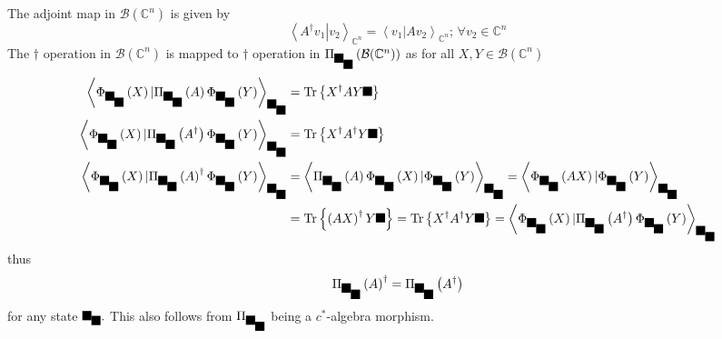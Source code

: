 \documentclass[aps,preprint]{revtex4}%
\providecommand{\U}[1]{\protect\rule{.1in}{.1in}}
\begin{document}
The adjoint map in $\mathcal{B}(\mathbb{C}^{n})$ is given by
\begin{equation}
\left\langle \left.  A^{\dagger}v_{1}\right\vert v_{2}\right\rangle
_{\mathbb{C}^{n}}=\left\langle \left.  v_{1}\right\vert Av_{2}\right\rangle
_{\mathbb{C}^{n}};\,\forall v_{2}\in\mathbb{C}^{n}%
\end{equation}
The $\dagger$ operation in $\mathcal{B}(\mathbb{C}^{n})$ is mapped to
$\dagger$ operation in $\Pi_{\U{3c9} _{\U{3c1} }}\left(  \mathcal{B}%
(\mathbb{C}^{n})\right)  $ as for all $X,Y\in\mathcal{B}(\mathbb{C}^{n})$
\begin{align}
\left\langle \Phi_{\U{3c9} _{\U{3c1} }}\left(  X\right)  |\Pi_{\U{3c9}
_{\U{3c1} }}\left(  A\right)  \Phi_{\U{3c9} _{\U{3c1} }}\left(  Y\right)
\right\rangle _{\U{3c9} _{\U{3c1} }}  &  =\operatorname{Tr}\left\{
X^{\dagger}AY\U{3c1} \right\} \\
\left\langle \Phi_{\U{3c9} _{\U{3c1} }}\left(  X\right)  |\Pi_{\U{3c9}
_{\U{3c1} }}\left(  A^{\dagger}\right)  \Phi_{\U{3c9} _{\U{3c1} }}\left(
Y\right)  \right\rangle _{\U{3c9} _{\U{3c1} }}  &  =\operatorname{Tr}\left\{
X^{\dagger}A^{\dagger}Y\U{3c1} \right\} \\
\left\langle \Phi_{\U{3c9} _{\U{3c1} }}\left(  X\right)  |\Pi_{\U{3c9}
_{\U{3c1} }}\left(  A\right)  ^{\dagger}\Phi_{\U{3c9} _{\U{3c1} }}\left(
Y\right)  \right\rangle _{\U{3c9} _{\U{3c1} }}  &  =\left\langle \Pi_{\U{3c9}
_{\U{3c1} }}\left(  A\right)  \Phi_{\U{3c9} _{\U{3c1} }}\left(  X\right)
|\Phi_{\U{3c9} _{\U{3c1} }}\left(  Y\right)  \right\rangle _{\U{3c9} _{\U{3c1}
}}=\left\langle \Phi_{\U{3c9} _{\U{3c1} }}\left(  AX\right)  |\Phi_{\U{3c9}
_{\U{3c1} }}\left(  Y\right)  \right\rangle _{\U{3c9} _{\U{3c1} }}\\
&  =\operatorname{Tr}\left\{  \left(  AX\right)  ^{\dagger}Y\U{3c1} \right\}
=\operatorname{Tr}\left\{  X^{\dagger}A^{\dagger}Y\U{3c1} \right\}
=\left\langle \Phi_{\U{3c9} _{\U{3c1} }}\left(  X\right)  |\Pi_{\U{3c9}
_{\U{3c1} }}\left(  A^{\dagger}\right)  \Phi_{\U{3c9} _{\U{3c1} }}\left(
Y\right)  \right\rangle _{\U{3c9} _{\U{3c1} }}%
\end{align}
thus
\begin{equation}
\Pi_{\U{3c9} _{\U{3c1} }}\left(  A\right)  ^{\dagger}=\Pi_{\U{3c9} _{\U{3c1}
}}\left(  A^{\dagger}\right)
\end{equation}
for any state $\U{3c9} _{\U{3c1} }.$ This also follows from $\Pi_{\U{3c9}
_{\U{3c1} }}$ being a $c^{\ast}$-algebra morphism.
\end{document}
